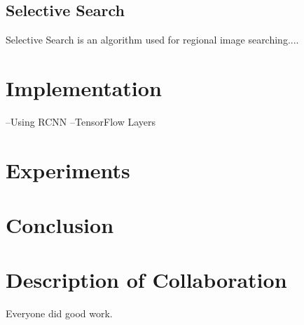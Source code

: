 \documentclass[10pt]{article}
\begin{document}
\subsection{Selective Search}
Selective Search is an algorithm used for regional image searching....
	

\section{Implementation}
--Using RCNN
--TensorFlow Layers

\section{Experiments}

\section{Conclusion}

\section{Description of Collaboration}
Everyone did good work.




\end{document}
